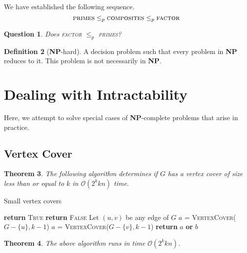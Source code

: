 \documentclass[10pt, oneside, reqno]{amsart}
\theoremstyle{plain}%
\newtheorem{thm}{Theorem}[section]
\newtheorem{question}[thm]{Question}
\theoremstyle{definition}
\newtheorem{defn}[thm]{Definition}
\theoremstyle{remark}
\newcommand{\bigo}[1]{\mathcal{O}(#1)}
\begin{document}
We have established the following sequence.\[
	\textsc{primes} \leq_p \textsc{composites} \leq_p \textsc{factor}
\]

\begin{question}
	Does \textsc{factor} $\leq_p$ \textsc{primes}?
\end{question}


\begin{defn}[\textbf{NP}-hard]
	A decision problem such that every problem in \textbf{NP} reduces to it.  This problem is not necessarily in \textbf{NP}.
\end{defn}





\section{Dealing with Intractability} %
\label{sec:dealing_with_intractability}
Here, we attempt to solve special cases of \textbf{NP}-complete problems that arise in practice.  

\subsection{Vertex Cover} %
\label{sub:vertex_cover}

\begin{thm}
	The following algorithm determines if $G$ has a vertex cover of size less than or equal to $k$ in $\bigo{2^k k n}$ time.
\end{thm}

\begin{algorithm}[H]
	\label{alg:Vecter Cover}
	\caption{Small vertex covers}
	\begin{algorithmic}[1]
			 {\textbf{return} \textsc{True}}
			\EndIf
			 \textbf{return} \textsc{False}
			\EndIf
			\State
			\State Let $(u,v)$ be any edge of $G$
			\State $a$ = \textsc{VertexCover}($G-\{u\}, k-1$)
			\State $a$ = \textsc{VertexCover}($G-\{v\}, k-1$)
			\State \textbf{return} $a$ \textbf{or} $b$
		\EndProcedure
	\end{algorithmic}
\end{algorithm}

\begin{thm}
	The above algorithm runs in time $\bigo{2^k k n}$.
\end{thm}
\end{document}

